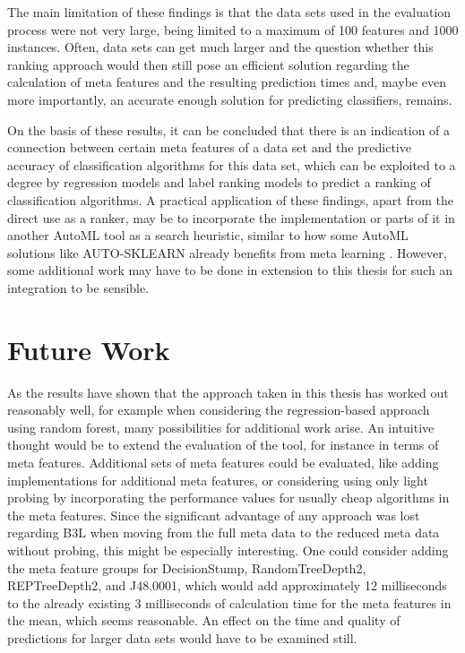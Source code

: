 The main limitation of these findings is that the data sets used in the evaluation process were not very large, being limited to a maximum of 100 features and 1000 instances. Often, data sets can get much larger and the question whether this ranking approach would then still pose an efficient solution regarding the calculation of meta features and the resulting prediction times and, maybe even more importantly, an accurate enough solution for predicting classifiers, remains. 

On the basis of these results, it can be concluded that there is an indication of a connection between certain meta features of a data set and the predictive accuracy of classification algorithms for this data set, which can be exploited to a degree by regression models and label ranking models to predict a ranking of classification algorithms. A practical application of these findings, apart from the direct use as a ranker, may be to incorporate the implementation or parts of it in another AutoML tool as a search heuristic, similar to how some AutoML solutions like AUTO-SKLEARN already benefits from meta learning \cite{feurer2015efficient}. However, some additional work may have to be done in extension to this thesis for such an integration to be sensible.

\section{Future Work}
\label{sec:conclusion:future}
As the results have shown that the approach taken in this thesis has worked out reasonably well, for example when considering the regression-based approach using random forest, many possibilities for additional work arise. An intuitive thought would be to extend the evaluation of the tool, for instance in terms of meta features. Additional sets of meta features could be evaluated, like adding implementations for additional meta features, or considering using only light probing by incorporating the performance values for usually cheap algorithms in the meta features. Since the significant advantage of any approach was lost regarding B3L when moving from the full meta data to the reduced meta data without probing, this might be especially interesting. One could consider adding the meta feature groups for DecisionStump, RandomTreeDepth2, REPTreeDepth2, and J48.0001, which would add approximately 12 milliseconds to the already existing 3 milliseconds of calculation time for the meta features in the mean, which seems reasonable. An effect on the time and quality of predictions for larger data sets would have to be examined still.

